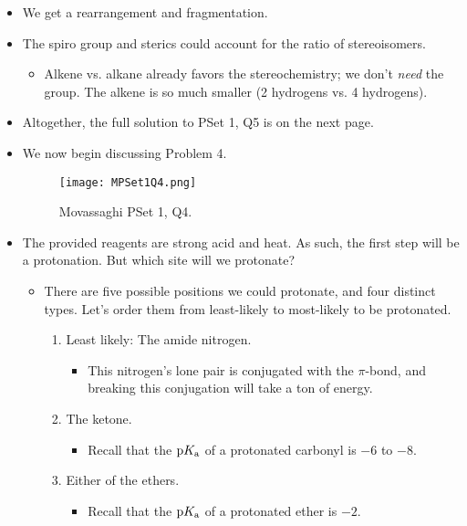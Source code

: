 \documentclass[../notes.tex]{subfiles}
\begin{document}
\begin{itemize}
\begin{itemize}
    \end{itemize}
    \item We get a rearrangement and fragmentation.
    \item The spiro group and sterics could account for the ratio of stereoisomers.
    \begin{itemize}
        \item Alkene vs. alkane already favors the stereochemistry; we don't \emph{need} the  group. The alkene is so much smaller (2 hydrogens vs. 4 hydrogens).
    \end{itemize}
    \item Altogether, the full solution to PSet 1, Q5 is on the next page.
    
    \item We now begin discussing Problem 4.
    \begin{figure}[h!]
        \centering
        \texttt{[image: MPSet1Q4.png]}
        \caption{Movassaghi PSet 1, Q4.}
        \label{fig:MPSet1Q4}
    \end{figure}
    \item The provided reagents are strong acid and heat. As such, the first step will be a protonation. But which site will we protonate?
    \begin{itemize}
        \item There are five possible positions we could protonate, and four distinct types. Let's order them from least-likely to most-likely to be protonated.
        \begin{enumerate}
            \item Least likely: The amide nitrogen.
            \begin{itemize}
                \item This nitrogen's lone pair is conjugated with the  $\pi$-bond, and breaking this conjugation will take a ton of energy.
            \end{itemize}
            \item The ketone.
            \begin{itemize}
                \item Recall that the $\textup{p}K_\textup{a}$ of a protonated carbonyl is $-6$ to $-8$.
            \end{itemize}
            \item Either of the ethers.
            \begin{itemize}
                \item Recall that the $\textup{p}K_\textup{a}$ of a protonated ether is $-2$.

\end{itemize}
\end{enumerate}
\end{itemize}
\end{itemize}
\end{document}

